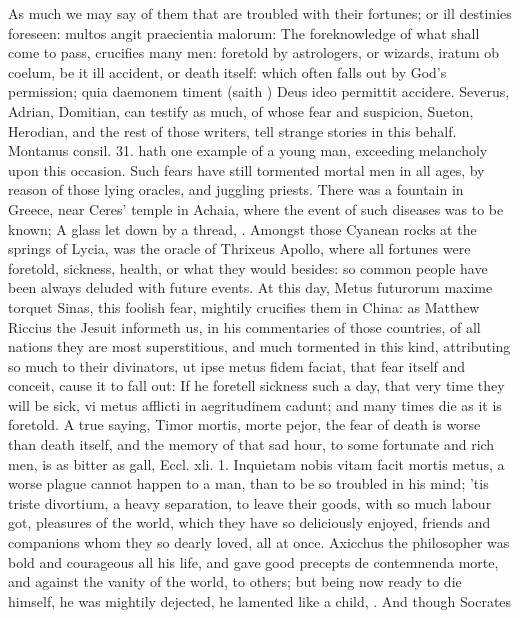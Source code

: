 {As much we may say of them that are troubled with their fortunes; or
ill destinies foreseen: multos angit praecientia malorum: The
foreknowledge of what shall come to pass, crucifies many men: foretold
by astrologers, or wizards, iratum ob coelum, be it ill accident, or
death itself: which often falls out by God's permission; quia daemonem
timent (saith \Chrysostom{}) Deus ideo permittit accidere. Severus,
Adrian, Domitian, can testify as much, of whose fear and suspicion,
Sueton, Herodian, and the rest of those writers, tell strange stories
in this behalf. Montanus consil. 31. hath one example of a young
man, exceeding melancholy upon this occasion. Such fears have still
tormented mortal men in all ages, by reason of those lying oracles, and
juggling priests. There was a fountain in Greece, near Ceres'
temple in Achaia, where the event of such diseases was to be known; A
glass let down by a thread, \etc{}. Amongst those Cyanean rocks at the
springs of Lycia, was the oracle of Thrixeus Apollo, where all fortunes
were foretold, sickness, health, or what they would besides: so common
people have been always deluded with future events. At this day, Metus
futurorum maxime torquet Sinas, this foolish fear, mightily crucifies
them in China: as Matthew Riccius the Jesuit informeth us, in his
commentaries of those countries, of all nations they are most
superstitious, and much tormented in this kind, attributing so much to
their divinators, ut ipse metus fidem faciat, that fear itself and
conceit, cause it to fall out: If he foretell sickness such a
day, that very time they will be sick, vi metus afflicti in
aegritudinem cadunt; and many times die as it is foretold. A true
saying, Timor mortis, morte pejor, the fear of death is worse than
death itself, and the memory of that sad hour, to some fortunate and
rich men, is as bitter as gall, Eccl. xli. 1. Inquietam nobis vitam
facit mortis metus, a worse plague cannot happen to a man, than to be
so troubled in his mind; 'tis triste divortium, a heavy separation, to
leave their goods, with so much labour got, pleasures of the world,
which they have so deliciously enjoyed, friends and companions whom
they so dearly loved, all at once. Axicchus the philosopher was bold
and courageous all his life, and gave good precepts de contemnenda
morte, and against the vanity of the world, to others; but being now
ready to die himself, he was mightily dejected,  he lamented like a child, \etc{}. And though Socrates
}
